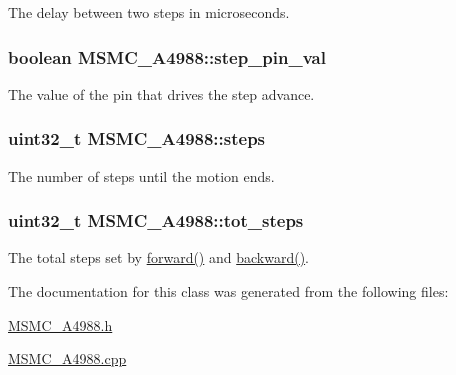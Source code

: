 The delay between two steps in microseconds. 

\hypertarget{class_m_s_m_c___a4988_a1ec86b6286b8827eca6d5703a02f65fd}{
\subsubsection[{step\+\_\+pin\+\_\+val}]{\setlength{\rightskip}{0pt plus 5cm}boolean M\+S\+M\+C\+\_\+\+A4988\+::step\+\_\+pin\+\_\+val\hspace{0.3cm}{\ttfamily [private]}}}\label{class_m_s_m_c___a4988_a1ec86b6286b8827eca6d5703a02f65fd}


The value of the pin that drives the step advance. 

\hypertarget{class_m_s_m_c___a4988_aa85fc95facc940db652cd2f545f033cd}{
\subsubsection[{steps}]{\setlength{\rightskip}{0pt plus 5cm}uint32\+\_\+t M\+S\+M\+C\+\_\+\+A4988\+::steps\hspace{0.3cm}{\ttfamily [private]}}}\label{class_m_s_m_c___a4988_aa85fc95facc940db652cd2f545f033cd}


The number of steps until the motion ends. 

\hypertarget{class_m_s_m_c___a4988_aa7de83eb15a9f82533b898146921939b}{
\subsubsection[{tot\+\_\+steps}]{\setlength{\rightskip}{0pt plus 5cm}uint32\+\_\+t M\+S\+M\+C\+\_\+\+A4988\+::tot\+\_\+steps\hspace{0.3cm}{\ttfamily [private]}}}\label{class_m_s_m_c___a4988_aa7de83eb15a9f82533b898146921939b}


The total steps set by \hyperlink{class_m_s_m_c___a4988_a9acdbabf546656a6436e89579e8fcfca}{forward()} and \hyperlink{class_m_s_m_c___a4988_a836bed9e28e723ead2a94446bb704869}{backward()}. 



The documentation for this class was generated from the following files\+:\begin{DoxyCompactItemize}
\item 
\hyperlink{_m_s_m_c___a4988_8h}{M\+S\+M\+C\+\_\+\+A4988.\+h}\item 
\hyperlink{_m_s_m_c___a4988_8cpp}{M\+S\+M\+C\+\_\+\+A4988.\+cpp}\end{DoxyCompactItemize}
